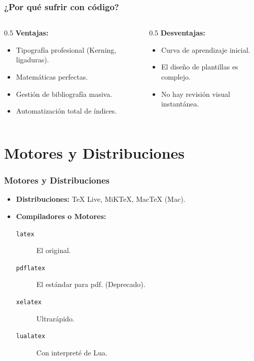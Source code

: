 \documentclass[12pt,aspectratio=169,ignorenonframetext]{ltxbeamer}
\begin{document}
\begin{frame}
\frametitle{¿Por qué sufrir con código?}
\begin{columns}
    \begin{column}{0.5\textwidth}
        \textbf{Ventajas:}
        \begin{itemize}
            \item Tipografía profesional (Kerning, ligaduras).
            \item Matemáticas perfectas.
            \item Gestión de bibliografía masiva.
            \item Automatización total de índices.
        \end{itemize}
    \end{column}

    \begin{column}{0.5\textwidth}
        \textbf{Desventajas:}
        \begin{itemize}
            \item Curva de aprendizaje inicial.
            \item El diseño de plantillas es complejo.
            \item No hay revisión visual instantánea.
        \end{itemize}
    \end{column}
\end{columns}
\end{frame}



\section{Motores y Distribuciones}

\begin{frame}
\frametitle{Motores y Distribuciones}
\begin{itemize}
    \item \textbf{Distribuciones:} TeX Live, MiKTeX, MacTeX (Mac).
    \item \textbf{Compiladores o Motores:}
    \begin{description}
        \item[\texttt{latex}] El original.
        \item[\texttt{pdflatex}] El estándar para pdf. (Deprecado).
        \item[\alert<2->{\texttt{xelatex}}] Ultrarápido.
        \item[\alert<2->{\texttt{lualatex}}] Con interpreté de Lua.
    \end{description}
\end{itemize}
\end{frame}
\end{document}
